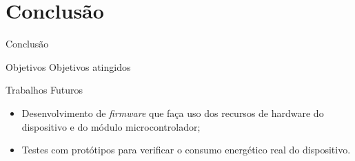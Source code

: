 \section{Conclusão}
\begin{frame}{Conclusão}
    
    \begin{block}{Objetivos}
        Objetivos atingidos
    \end{block}

    \begin{block}{Trabalhos Futuros}

        \begin{itemize}
            \item Desenvolvimento de \textit{firmware} que
            faça uso dos recursos de hardware do dispositivo
            e do módulo microcontrolador;

            \item Testes com protótipos para verificar o 
            consumo energético real do dispositivo.


        \end{itemize}

        
    \end{block}




\end{frame}

